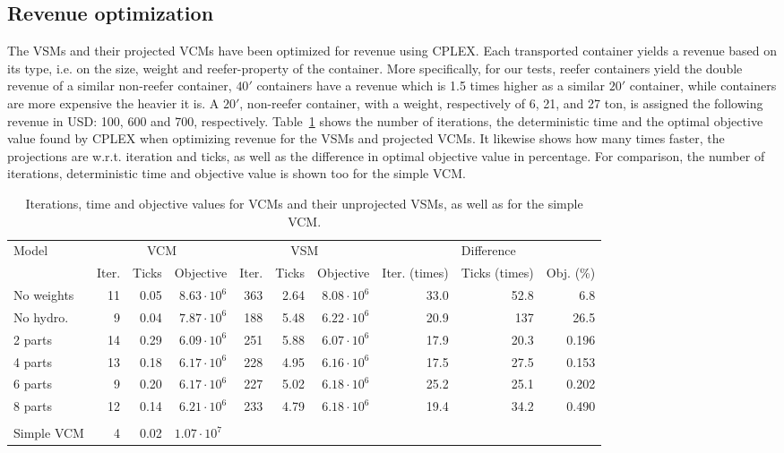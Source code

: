 \documentclass[citeauthoryear]{llncs}
\begin{document}
\subsection{Revenue optimization}
The VSMs and their projected VCMs have been optimized for revenue using CPLEX. Each transported container yields a revenue based on its type, i.e. on the size, weight and reefer-property of the container. More specifically, for our tests, reefer containers yield the double revenue of a similar non-reefer container, $40'$ containers have a revenue which is 1.5 times higher as a similar $20'$ container, while containers are more expensive the heavier it is. A $20'$, non-reefer container, with a weight, respectively of 6, 21, and 27 ton, is assigned the following revenue in USD: 100, 600 and 700, respectively. Table~\ref{tab:usingProjections} shows the number of iterations, the deterministic time and the optimal objective value found by CPLEX when optimizing revenue for the VSMs and projected VCMs. It likewise shows how many times faster, the projections are w.r.t. iteration and ticks, as well as the difference in optimal objective value in percentage. For comparison, the number of iterations, deterministic time and objective value is shown too for the simple VCM.
\begin{table}[htbp]
\centering
\begin{tabular}{l|rrr|rrr|rrr}
\toprule
Model&\multicolumn{3}{c|}{VCM}&\multicolumn{3}{c|}{VSM}&\multicolumn{3}{c}{Difference}\\
&Iter.&Ticks&Objective&Iter.&Ticks&Objective&Iter. (times)&Ticks (times)&Obj. (\%)\\ 
\midrule
No weights&	11 & 0.05 & $8.63\cdot 10^6$ &	363 & 2.64&$8.08\cdot 10^6$
&33.0&52.8&6.8\\
\midrule
{No hydro.}& 9 & 0.04 &$7.87\cdot 10^6$&	188 & 5.48&$6.22 \cdot 10^6$
&20.9&137&26.5\\
\midrule
{2 parts}& 14 & 0.29 & $6.09\cdot 10^6$ &	251 & 5.88&$6.07\cdot 10^6$
&17.9&20.3&0.196\\
\midrule
{4 parts} &13 & 0.18 &$6.17\cdot 10^6$ & 228 & 4.95 &$6.16\cdot 10^6$
&17.5&27.5&0.153\\
\midrule
{6 parts} &9 & 0.20& $6.17\cdot 10^6$ &227 & 5.02 &$6.18\cdot 10^6$
&25.2&25.1&0.202\\
\midrule
{8 parts} &12 & 0.14& $6.21\cdot 10^6$ & 233 & 4.79 &$6.18\cdot 10^6$
&19.4&34.2&0.490\\
\bottomrule
\multicolumn{10}{c}{}\\
\cmidrule{1-4}
Simple VCM & 4 & 0.02 &\multicolumn{2}{l}{$1.07\cdot 10^7$}\\
\cmidrule{1-4}
\end{tabular}
\caption{Iterations, time and objective values for VCMs and their unprojected VSMs, as well as for the simple VCM. }
\label{tab:usingProjections}
\end{table}
\end{document}

